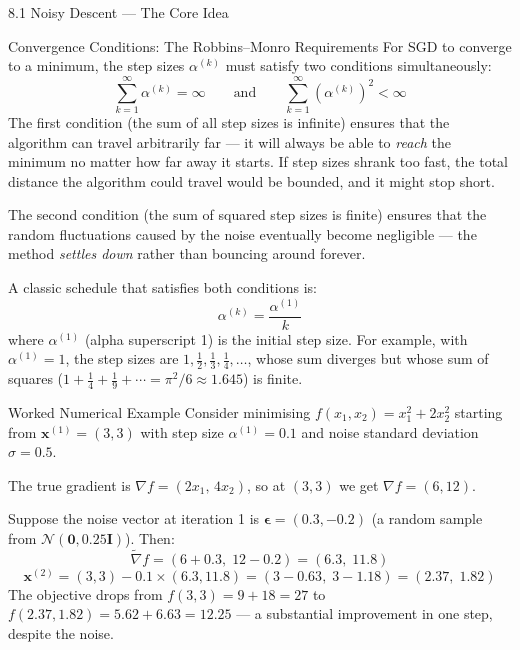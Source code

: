 \documentclass[aspectratio=169,10pt]{beamer}
\begin{document}
\begin{frame}[allowframebreaks]{8.1 Noisy Descent --- The Core Idea}
\begin{block}{Convergence Conditions: The Robbins--Monro Requirements}
For SGD to converge to a minimum, the step sizes $\alpha^{(k)}$ must satisfy two conditions simultaneously:
\[
  \sum_{k=1}^{\infty} \alpha^{(k)} = \infty \qquad \text{and} \qquad
  \sum_{k=1}^{\infty} \left(\alpha^{(k)}\right)^2 < \infty
\]
The first condition (the sum of all step sizes is infinite) ensures that the algorithm can travel arbitrarily far --- it will always be able to \emph{reach} the minimum no matter how far away it starts. If step sizes shrank too fast, the total distance the algorithm could travel would be bounded, and it might stop short.

The second condition (the sum of squared step sizes is finite) ensures that the random fluctuations caused by the noise eventually become negligible --- the method \emph{settles down} rather than bouncing around forever.

A classic schedule that satisfies both conditions is:
\[
  \alpha^{(k)} = \frac{\alpha^{(1)}}{k}
\]
where $\alpha^{(1)}$ (alpha superscript 1) is the initial step size. For example, with $\alpha^{(1)} = 1$, the step sizes are $1, \tfrac{1}{2}, \tfrac{1}{3}, \tfrac{1}{4}, \ldots$, whose sum diverges but whose sum of squares ($1 + \tfrac{1}{4} + \tfrac{1}{9} + \cdots = \pi^2/6 \approx 1.645$) is finite.
\end{block}

\begin{exampleblock}{Worked Numerical Example}
Consider minimising $f(x_1, x_2) = x_1^2 + 2x_2^2$ starting from $\mathbf{x}^{(1)} = (3, 3)$ with step size $\alpha^{(1)} = 0.1$ and noise standard deviation $\sigma = 0.5$.

The true gradient is $\nabla f = (2x_1,\, 4x_2)$, so at $(3, 3)$ we get $\nabla f = (6, 12)$.

Suppose the noise vector at iteration 1 is $\boldsymbol{\epsilon} = (0.3, -0.2)$ (a random sample from $\mathcal{N}(\mathbf{0}, 0.25\mathbf{I})$). Then:
\[
  \tilde{\nabla} f = (6 + 0.3,\; 12 - 0.2) = (6.3,\; 11.8)
\]
\[
  \mathbf{x}^{(2)} = (3, 3) - 0.1 \times (6.3, 11.8) = (3 - 0.63,\; 3 - 1.18) = (2.37,\; 1.82)
\]
The objective drops from $f(3,3) = 9 + 18 = 27$ to $f(2.37, 1.82) = 5.62 + 6.63 = 12.25$ --- a substantial improvement in one step, despite the noise.
\end{exampleblock}

\end{frame}
\end{document}
